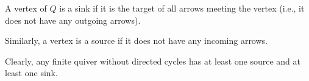  A vertex of $Q$ is a sink if it is the target of all arrows meeting the
 vertex (i.e., it does not have any outgoing arrows).

 Similarly, a vertex is a source if it does not have any incoming arrows.

Clearly, any finite quiver without directed cycles has at least one source
and at least one sink.
